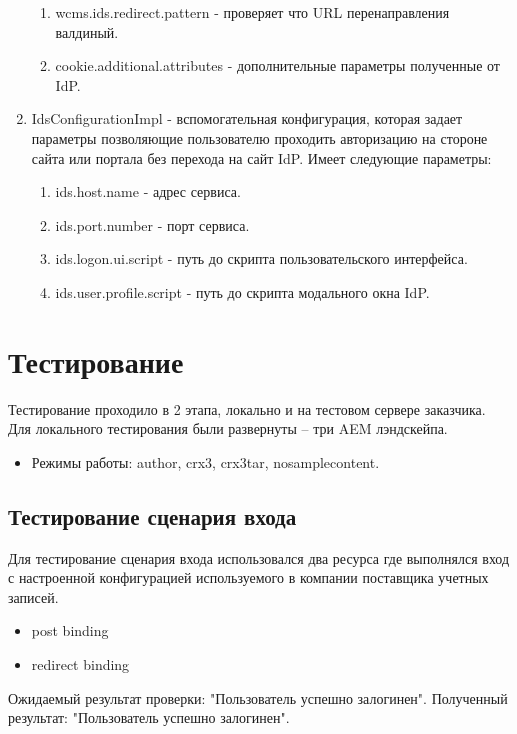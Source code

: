\begin{enumerate}
\begin{enumerate}
\item wcms.ids.redirect.pattern - проверяет что URL перенаправления валдиный. 
\item cookie.additional.attributes - дополнительные параметры полученные от IdP.
\end{enumerate}
\item IdsConfigurationImpl - вспомогательная конфигурация, которая задает параметры позволяющие пользователю проходить авторизацию на стороне сайта или портала без перехода на сайт IdP. Имеет следующие параметры:
\begin{enumerate}
\item ids.host.name - адрес сервиса.
\item ids.port.number - порт сервиса.
\item ids.logon.ui.script - путь до скрипта пользовательского интерфейса.
\item ids.user.profile.script - путь до скрипта модального окна IdP.
\end{enumerate}
\end{enumerate}

\section{Тестирование}

Тестирование проходило в 2 этапа, локально и на тестовом сервере заказчика.
Для локального тестирования были развернуты – три AEM лэндскейпа.
\begin{itemize}
\item Режимы работы: author, crx3, crx3tar, nosamplecontent.
\end{itemize}

\subsection{Тестирование сценария входа}
Для тестирование сценария входа использовался два ресурса где выполнялся вход с настроенной конфигурацией используемого в компании поставщика учетных записей.
\begin{itemize}
\item post binding
\item redirect binding
\end{itemize}

Ожидаемый результат проверки: "Пользователь успешно залогинен". 
Полученный результат: "Пользователь успешно залогинен".

